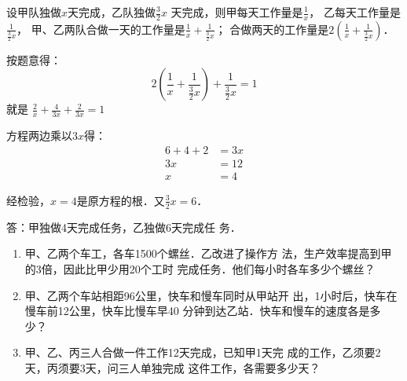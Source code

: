 \begin{solution}
    设甲队独做$x$天完成，乙队独做$\frac{3}{2}x$
天完成，则甲每天工作量是$\frac{1}{x}$，
乙每天工作量是$\frac{1}{\tfrac{3}{2}x}$，
甲、乙两队合做一天的工作量是$\frac{1}{x}+\frac{1}{\tfrac{3}{2}x}$；
合做两天的工作量是$2\left(\frac{1}{x}+\frac{1}{\tfrac{3}{2}x}\right)$．

按题意得：
\[2\left(\frac{1}{x}+\frac{1}{\tfrac{3}{2}x}\right)+\frac{1}{\tfrac{3}{2}x}=1\]
就是 $\frac{2}{x}+\frac{4}{3x}+\frac{2}{3x}=1$

方程两边乘以$3x$得：
\[\begin{split}
   6+4+2&=3x\\
3x&=12\\
x&=4 
\end{split}\]

经检验，$x=4$是原方程的根．又$\frac{3}{2}x=6$．

答：甲独做4天完成任务，乙独做6天完成任
务．
\end{solution}

\begin{ex}
\begin{enumerate}
    \item 甲、乙两个车工，各车1500个螺丝．乙改进了操作方
    法，生产效率提高到甲的3倍，因此比甲少用20个工时
    完成任务．他们每小时各车多少个螺丝？
    \item 甲、乙两个车站相距96公里，快车和慢车同时从甲站开
    出，1小时后，快车在慢车前12公里，快车比慢车早40
    分钟到达乙站．快车和慢车的速度各是多少？
    \item 甲、乙、丙三人合做一件工作12天完成，已知甲1天完
    成的工作，乙须要2天，丙须要3天，问三人单独完成
    这件工作，各需要多少天？
\end{enumerate}    
\end{ex}

